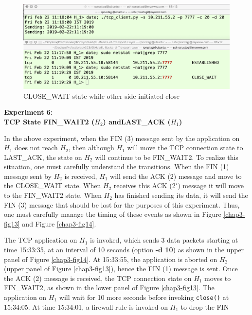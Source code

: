 \begin{figure}[!htb]
\centering
\includegraphics[scale=.45]{src/Figures/chap3/12.jpg}
\caption{CLOSE\_WAIT state while other side initiated close}\label{chap3-fig12}
\end{figure}

\begin{multicols}{2}
\noindent
\textbf{Experiment 6:\\ TCP State FIN\_WAIT2 (\boldmath$H_{2}$) and\hfill\break LAST\_ACK ($H_{1}$)}
\smallskip

In the above experiment, when the FIN (3) message sent by the application on $H_{1}$ does not reach $H_{2}$, then although $H_{1}$ will move the TCP connection state to LAST\_ACK, the state on $H_{2}$ will continue to be FIN\_WAIT2. To realize this situation, one must carefully understand the transitions. When the FIN (1) message sent by $H_{2}$ is received, $H_{1}$ will send the ACK (2) message and move to the CLOSE\_WAIT state. When $H_{2}$ receives this ACK ($2'$) message it will move to the FIN\_WAIT2 state. When $H_{2}$ has finished sending its data, it will send the FIN (3) message that should be lost for the purposes of this experiment. Thus, one must carefully manage the timing of these events as shown in  Figure \ref{chap3-fig13} and Figure \ref{chap3-fig14}.

{\parfillskip=0pt
The TCP application on $H_{1}$ is invoked, which sends 3 data packets starting at time 15:33:35, at an interval of 10 seconds (option \textbf{-d 10}) as shown in the upper panel of Figure \ref{chap3-fig14}. At 15:33:55, the application is aborted on $H_{2}$ (upper panel of Figure \ref{chap3-fig13}), hence the FIN (1) message is sent. Once the ACK (2) message is received, the TCP connection state on $H_{1}$ moves to FIN\_WAIT2, as shown in the lower panel of Figure \ref{chap3-fig13}. The application on $H_{1}$ will wait for 10 more seconds before invoking \lstinline|close()| at 15:34:05. At time 15:34:01, a firewall rule is invoked on $H_{1}$ to drop the FIN\par}
\end{multicols}


